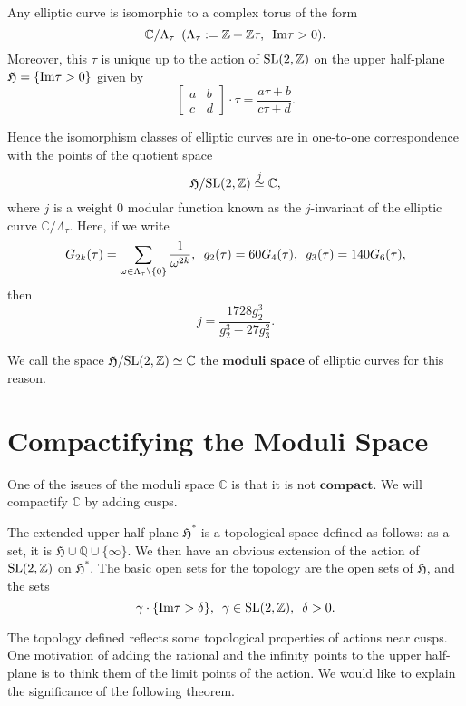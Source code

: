 \documentclass[a4paper,11pt]{article}
\begin{document}
\begin{thm}
Any  elliptic curve is isomorphic to a complex torus of the form
\[
\mathbb{C}/\Lambda_{\tau} \enskip (\Lambda_{\tau}:=\mathbb{Z}+\mathbb{Z}\tau, \enskip \textnormal{Im}\tau > 0).
\]
Moreover, this $\tau$ is unique up to the action of $\textnormal{SL}(2,\mathbb{Z})$ on the upper half-plane $\mathfrak{H}=\{\textnormal{Im}\tau>0\}$ given by
\[
\begin{bmatrix} a & b \\ c & d \end{bmatrix}\cdot\tau = \frac{a\tau+b}{c\tau+d}.
\]

Hence the isomorphism classes of elliptic curves are in one-to-one correspondence with the points of the quotient space
\[
\mathfrak{H}/\textnormal{SL}(2,\mathbb{Z}) \stackrel{j}{\simeq} \mathbb{C},
\]
where $j$ is a weight $0$ modular function known as the $j$-invariant of the elliptic curve $\mathbb{C}/\Lambda_{\tau}$.
Here, if we write
\[
G_{2k}(\tau)=\sum_{\omega \in \Lambda_{\tau} \setminus \{0\}}\frac{1}{\omega^{2k}}, \enskip
g_2(\tau)=60G_4(\tau), \enskip g_3(\tau)=140G_6(\tau),
\]
then
\[
j=\frac{1728g_2^3}{g_2^3-27g_3^2}.
\]
\end{thm}

We call the space $\mathfrak{H}/\textnormal{SL}(2,\mathbb{Z})\simeq\mathbb{C}$ the $\textbf{moduli space}$ of elliptic curves for this reason.

\section{Compactifying the Moduli Space}

One of the issues of the moduli space $\mathbb{C}$ is that it is not $\textbf{compact}$.
We will compactify $\mathbb{C}$ by adding cusps.

\begin{defn}
The extended upper half-plane $\mathfrak{H}^*$ is a topological space defined as follows: as a set, it is $\mathfrak{H}\cup\mathbb{Q}\cup\{\infty\}$.
We then have an obvious extension of the action of $\textnormal{SL}(2,\mathbb{Z})$ on $\mathfrak{H}^*$.
The basic open sets for the topology are the open sets of $\mathfrak{H}$, and the sets
\[
\gamma\cdot\{\textnormal{Im}\tau > \delta \}, \enskip \gamma \in \textnormal{SL}(2,\mathbb{Z}), \enskip \delta > 0.
\]
\end{defn}

The topology defined reflects some topological properties of actions near cusps.
One motivation of adding the rational and the infinity points to the upper half-plane is to think them of the limit points of the action.
We would like to explain the significance of the following theorem.
\end{document}
